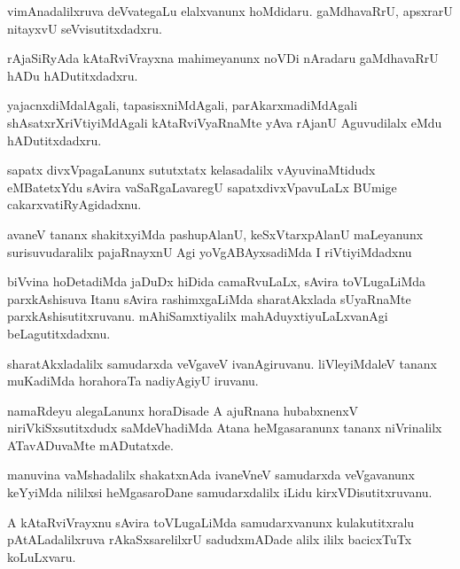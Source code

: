 \documentclass{article}
\begin{document}
\begin{mn}
vimAnadalilxruva deVvategaLu elalxvanunx hoMdidaru. gaMdhavaRrU,
apsxrarU nitayxvU seVvisutitxdadxru.
\end{mn}

\begin{mn}
rAjaSiRyAda kAtaRviVrayxna mahimeyanunx noVDi nAradaru gaMdhavaRrU
hADu hADutitxdadxru.
\end{mn}

\begin{mn}
yajacnxdiMdalAgali, tapasisxniMdAgali, parAkarxmadiMdAgali
shAsatxrXriVtiyiMdAgali kAtaRviVyaRnaMte yAva rAjanU Aguvudilalx eMdu hADutitxdadxru.
\end{mn}

\begin{mn}%
sapatx divxVpagaLanunx sututxtatx kelasadalilx vAyuvinaMtidudx
eMBatetxYdu sAvira vaSaRgaLavaregU sapatxdivxVpavuLaLx BUmige cakarxvatiRyAgidadxnu.
\end{mn}

\begin{mn}%
avaneV tananx shakitxyiMda pashupAlanU, keSxVtarxpAlanU maLeyanunx
surisuvudaralilx pajaRnayxnU Agi yoVgABAyxsadiMda I riVtiyiMdadxnu
\end{mn}

\begin{mn}%
biVvina hoDetadiMda jaDuDx hiDida camaRvuLaLx, sAvira toVLugaLiMda
parxkAshisuva Itanu sAvira rashimxgaLiMda sharatAkxlada sUyaRnaMte
parxkAshisutitxruvanu. mAhiSamxtiyalilx mahAduyxtiyuLaLxvanAgi beLagutitxdadxnu.
\end{mn}

\begin{mn}
sharatAkxladalilx samudarxda veVgaveV ivanAgiruvanu. liVleyiMdaleV
tananx muKadiMda horahoraTa nadiyAgiyU iruvanu.
\end{mn}

\begin{mn}
namaRdeyu alegaLanunx horaDisade A ajuRnana hubabxnenxV
niriVkiSxsutitxdudx saMdeVhadiMda Atana heMgasaranunx tananx
niVrinalilx ATavADuvaMte mADutatxde.
\end{mn}

\begin{mn}%
manuvina vaMshadalilx shakatxnAda ivaneVneV samudarxda veVgavanunx
keYyiMda nililxsi heMgasaroDane samudarxdalilx iLidu kirxVDisutitxruvanu.
\end{mn}

\begin{mn}
A kAtaRviVrayxnu sAvira toVLugaLiMda samudarxvanunx kulakutitxralu
pAtALadalilxruva rAkaSxsarelilxrU sadudxmADade alilx ililx bacicxTuTx koLuLxvaru.
\end{mn}
\end{document}
